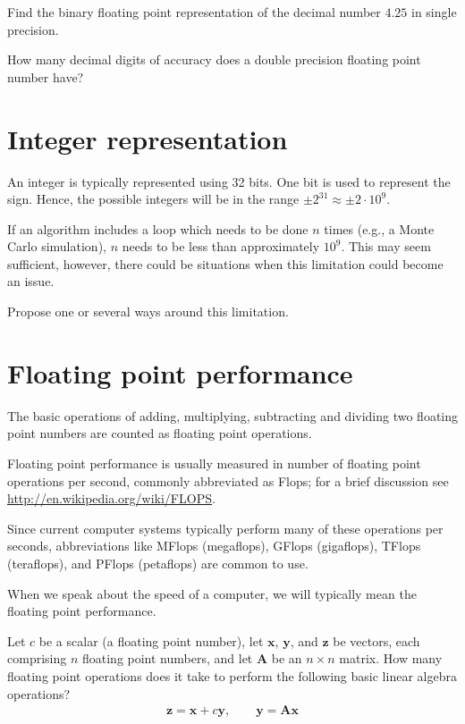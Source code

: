 \begin{ex}
  Find the binary floating point representation of the decimal number $4.25$ in
  single precision.
\end{ex}

\begin{ex}
  How many decimal digits of accuracy does a double precision floating point
  number have?
\end{ex}

\section{Integer representation}

An integer is typically represented using 32 bits. One bit is used to represent
the sign. Hence, the possible integers will be in the range $\pm 2^{31} \approx
\pm 2\cdot 10^9$.

If an algorithm includes a loop which needs to be done $n$ times (e.g., a Monte
Carlo simulation), $n$ needs to be less than approximately $10^9$. This may seem
sufficient, however, there could be situations when this limitation could become
an issue.

\begin{ex}
  Propose one or several ways around this limitation.
\end{ex}

\section{Floating point performance}

The basic operations of adding, multiplying, subtracting and dividing two
floating point numbers are counted as floating point operations.

Floating point performance is usually measured in number of floating point
operations per second, commonly abbreviated as Flops; for a brief discussion
see \url{http://en.wikipedia.org/wiki/FLOPS}.

Since current computer systems typically perform many of these operations per
seconds, abbreviations like MFlops (megaflops), GFlops (gigaflops), TFlops
(teraflops), and PFlops (petaflops) are common to use.

When we speak about the speed of a computer, we will typically mean the floating
point performance.

\begin{ex}
  Let $c$ be a scalar (a floating point number), let $\bm x$, $\bm y$, and $\bm
  z$ be vectors, each comprising $n$ floating point numbers, and let $\bm A$ be
  an $n\times n$ matrix. How many floating point operations does it take to
  perform the following basic linear algebra operations?
  \begin{align*}
  \bm z = \bm x + c \bm y, \qquad \bm y = \bm A \bm x
  \end{align*}
\end{ex}

